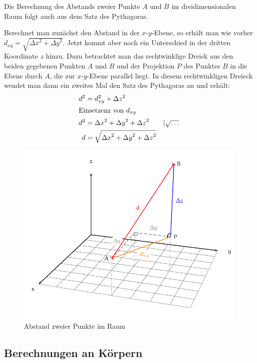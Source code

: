 \begin{folg}
 Die Berechnung des Abstands zweier Punkte \(A\) und \(B\) im dreidimensionalen Raum folgt auch aus dem Satz des Pythagoras.
 
 Berechnet man zunächst den Abstand in der \(x\)-\(y\)-Ebene, so erhält man wie vorher \(d_{xy}=\sqrt{{\Delta x}^2+{\Delta y}^2}\). Jetzt kommt aber noch ein Unterschied in der dritten Koordinate \(z\) hinzu. Dazu betrachtet man das rechtwinklige Dreick aus den beiden gegebenen Punkten \(A\) und \(B\) und der Projektion \(P\) des Punktes \(B\) in die Ebene durch \(A\), die zur \(x\)-\(y\)-Ebene parallel liegt. In diesem rechtwinkligen Dreieck wendet man dann ein zweites Mal den Satz des Pythagoras an und erhält:
 \begin{align*}
  d^2 &= d_{xy}^2+{\Delta z}^2 \\
  \intertext{Einsetzenz von \(d_{xy}\)}
  d^2 &= {\Delta x}^2 + {\Delta y}^2 + {\Delta z}^2 & |\sqrt{\ldots} \\
  d &= \sqrt{{\Delta x}^2 + {\Delta y}^2 + {\Delta z}^2}
 \end{align*}

 \begin{figure}
\centering
\includegraphics[width=\textwidth]{./distanz.pdf}
\caption{Abstand zweier Punkte im Raum}
\end{figure}
\end{folg}



\subsection{Berechnungen an Körpern}

